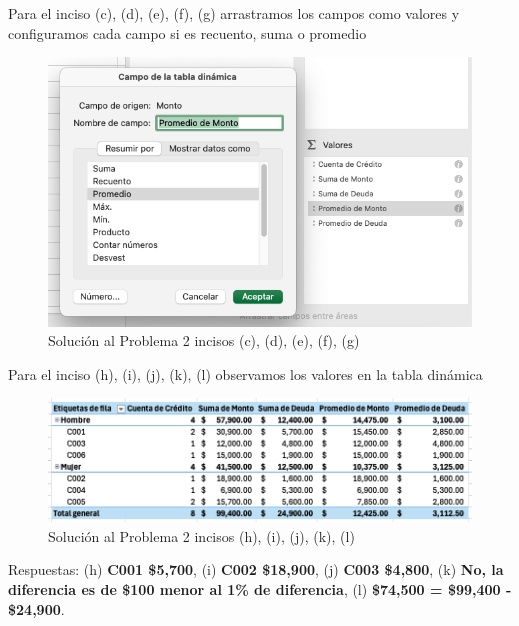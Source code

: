 \documentclass{article}
\begin{document}
\noindent
Para el inciso (c), (d), (e), (f), (g) arrastramos los campos como valores y configuramos cada campo si es recuento, suma o promedio
\begin{figure}[!h]
    \centering
    \begin{minipage}{\textwidth}
        \centering
        \includegraphics[width=\textwidth]{figures/s102-3.png}
    \end{minipage}
    \captionsetup{width=0.9\textwidth}
    \caption{Solución al Problema 2 incisos (c), (d), (e), (f), (g)}
    \label{fig:s102-3}
\end{figure}

\noindent
Para el inciso (h), (i), (j), (k), (l) observamos los valores en la tabla dinámica
\begin{figure}[!h]
    \centering
    \begin{minipage}{\textwidth}
        \centering
        \includegraphics[width=\textwidth]{figures/s102-4.png}
    \end{minipage}
    \captionsetup{width=0.9\textwidth}
    \caption{Solución al Problema 2 incisos (h), (i), (j), (k), (l)}
    \label{fig:s102-4}
\end{figure}

\noindent
Respuestas: (h) \textbf{C001 \$5,700}, (i) \textbf{C002 \$18,900}, (j) \textbf{C003 \$4,800}, (k) \textbf{No, la diferencia es de \$100 menor al 1\% de diferencia}, (l) \textbf{\$74,500 = \$99,400 - \$24,900}.
\end{document}
